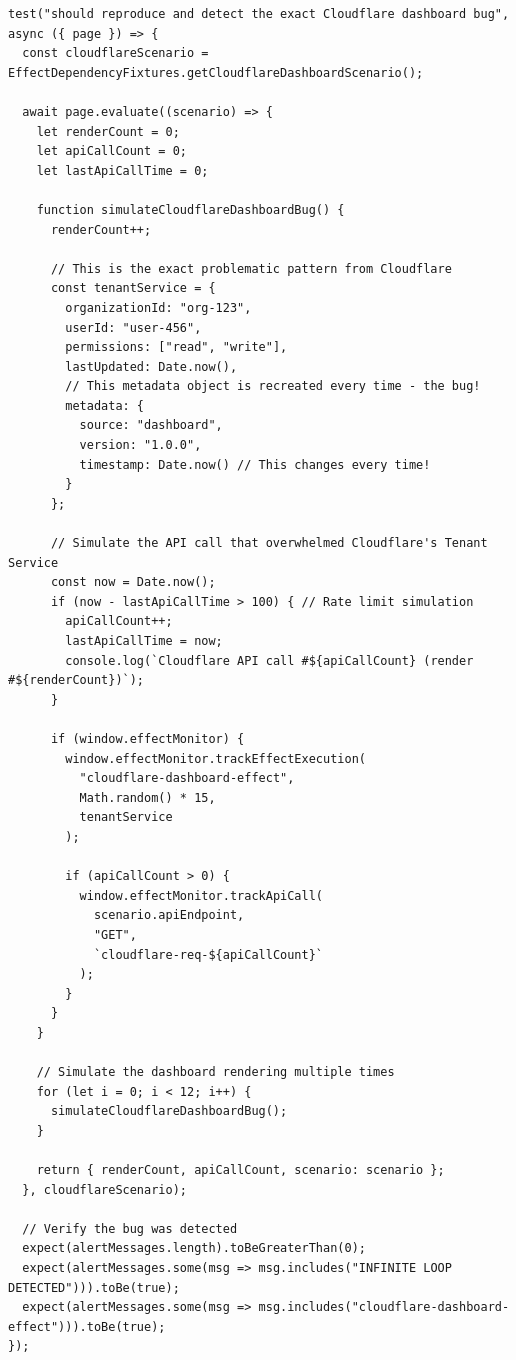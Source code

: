 \documentclass[10pt]{article}
\begin{document}
\begin{lstlisting}[caption={Cloudflare Outage Reproduction Test}]
test("should reproduce and detect the exact Cloudflare dashboard bug", async ({ page }) => {
  const cloudflareScenario = EffectDependencyFixtures.getCloudflareDashboardScenario();
  
  await page.evaluate((scenario) => {
    let renderCount = 0;
    let apiCallCount = 0;
    let lastApiCallTime = 0;

    function simulateCloudflareDashboardBug() {
      renderCount++;
      
      // This is the exact problematic pattern from Cloudflare
      const tenantService = {
        organizationId: "org-123",
        userId: "user-456", 
        permissions: ["read", "write"],
        lastUpdated: Date.now(),
        // This metadata object is recreated every time - the bug!
        metadata: {
          source: "dashboard",
          version: "1.0.0",
          timestamp: Date.now() // This changes every time!
        }
      };

      // Simulate the API call that overwhelmed Cloudflare's Tenant Service
      const now = Date.now();
      if (now - lastApiCallTime > 100) { // Rate limit simulation
        apiCallCount++;
        lastApiCallTime = now;
        console.log(`Cloudflare API call #${apiCallCount} (render #${renderCount})`);
      }

      if (window.effectMonitor) {
        window.effectMonitor.trackEffectExecution(
          "cloudflare-dashboard-effect",
          Math.random() * 15,
          tenantService
        );

        if (apiCallCount > 0) {
          window.effectMonitor.trackApiCall(
            scenario.apiEndpoint,
            "GET",
            `cloudflare-req-${apiCallCount}`
          );
        }
      }
    }

    // Simulate the dashboard rendering multiple times
    for (let i = 0; i < 12; i++) {
      simulateCloudflareDashboardBug();
    }

    return { renderCount, apiCallCount, scenario: scenario };
  }, cloudflareScenario);

  // Verify the bug was detected
  expect(alertMessages.length).toBeGreaterThan(0);
  expect(alertMessages.some(msg => msg.includes("INFINITE LOOP DETECTED"))).toBe(true);
  expect(alertMessages.some(msg => msg.includes("cloudflare-dashboard-effect"))).toBe(true);
});
\end{lstlisting}
\end{document}
